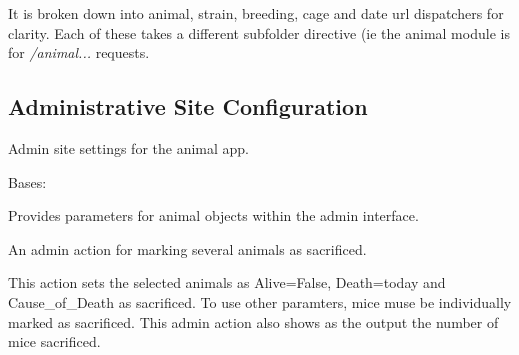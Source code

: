 \documentclass[letterpaper,10pt,english]{sphinxmanual}
\begin{document}
It is broken down into animal, strain, breeding, cage and date url dispatchers for clarity.
Each of these takes a different subfolder directive (ie the animal module is for \emph{/animal...} requests.


\subsection{Administrative Site Configuration}
\label{api:id6}\label{api:module-mousedb.animal.admin}
Admin site settings for the animal app.


\begin{fulllineitems}
\label{api:mousedb.animal.admin.AnimalAdmin}
Bases: 

Provides parameters for animal objects within the admin interface.


\begin{fulllineitems}
\label{api:mousedb.animal.admin.AnimalAdmin.mark_sacrificed}
An admin action for marking several animals as sacrificed.

This action sets the selected animals as Alive=False, Death=today and Cause\_of\_Death as sacrificed.  To use other paramters, mice muse be individually marked as sacrificed.
This admin action also shows as the output the number of mice sacrificed.

\end{fulllineitems}



\begin{fulllineitems}
\label{api:mousedb.animal.admin.AnimalAdmin.media}
\end{fulllineitems}


\end{fulllineitems}


\end{document}

